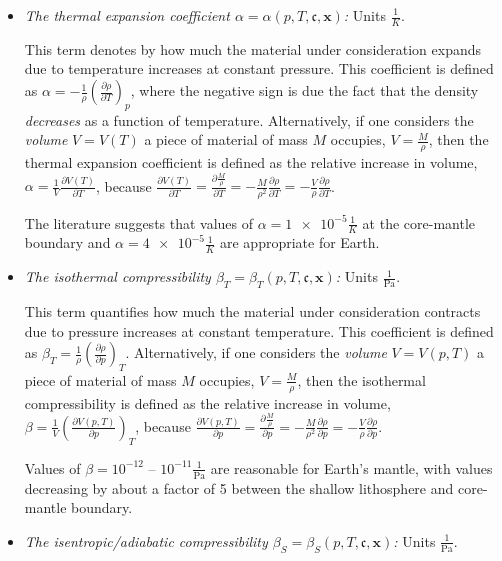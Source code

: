 \documentclass{article}
\begin{document}
\begin{itemize}
\item \textit{The thermal expansion coefficient $\alpha=\alpha(p,T,\mathfrak c ,\mathbf x)$:} Units
  $\frac{1}{\si{K}}$.

  This term denotes by how much the material under consideration
  expands due to temperature increases at constant pressure.
  This coefficient is defined as
  $\alpha = -\frac{1}{\rho} \left(\frac{\partial \rho}{\partial T}\right)_{p}$,
  where the negative sign is due the fact that the density
  \textit{decreases} as a function of temperature. Alternatively, if
  one considers the \textit{volume} $V=V(T)$ a piece of material of mass $M$
  occupies, $V=\frac{M}{\rho}$, then the thermal expansion coefficient
  is defined as the relative increase in volume,
  $\alpha=\frac{1}{V}\frac{\partial V(T)}{\partial T}$, because
  $\frac{\partial V(T)}{\partial T} =
   \frac{\partial \frac{M}{\rho}}{\partial T} =
   -\frac{M}{\rho^2} \frac{\partial \rho}{\partial T} =
   -\frac{V}{\rho} \frac{\partial \rho}{\partial T}$.

   The literature suggests that values of $\alpha=\num{1e-5}\frac{1}{\si{K}}$ at the core-mantle boundary and $\alpha=\num{4e-5}\frac{1}{\si{K}}$ are appropriate for Earth.

\item \textit{The isothermal compressibility $\beta_T=\beta_T(p,T,\mathfrak c ,\mathbf x)$:} Units
  $\frac{1}{\textrm{Pa}}$.

  This term quantifies how much the material under consideration
  contracts due to pressure increases at constant temperature.
  This coefficient is defined as
  $\beta_T = \frac{1}{\rho} \left( \frac{\partial \rho}{\partial p} \right)_{T}$.
  Alternatively, if
  one considers the \textit{volume} $V=V(p, T)$ a piece of material of mass $M$
  occupies, $V=\frac{M}{\rho}$, then the isothermal compressibility
  is defined as the relative increase in volume,
  $\beta=\frac{1}{V}\left(\frac{\partial V(p, T)}{\partial p}\right)_{T}$, because
  $\frac{\partial V(p, T)}{\partial p} =
   \frac{\partial \frac{M}{\rho}}{\partial p} =
   -\frac{M}{\rho^2} \frac{\partial \rho}{\partial p} =
   -\frac{V}{\rho} \frac{\partial \rho}{\partial p}$.

   Values of $\beta=10^{-12}$ -- $10^{-11} \frac{1}{\textrm{Pa}}$
   are reasonable for Earth's mantle, with values decreasing by about a factor of 5 between the shallow lithosphere and core-mantle boundary.

\item \textit{The isentropic/adiabatic compressibility $\beta_S=\beta_S(p,T,\mathfrak c ,\mathbf x)$:} Units
  $\frac{1}{\textrm{Pa}}$.


\end{itemize}
\end{document}
